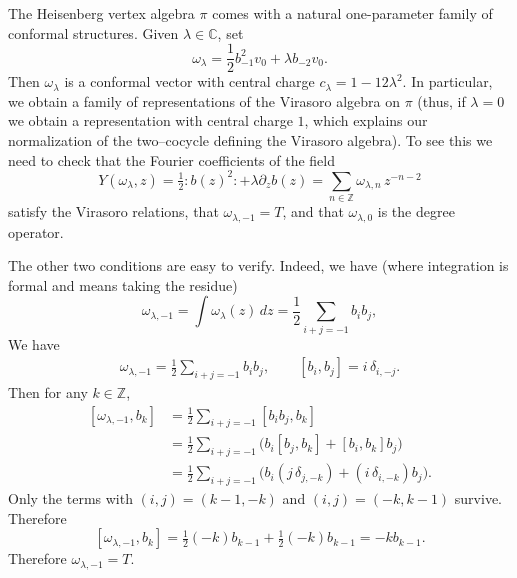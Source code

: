 \documentclass[12pt]{article}
\begin{document}
\begin{example}
The Heisenberg vertex algebra $\pi$ comes with a natural one-parameter
family of conformal structures. Given $\lambda\in\mathbb{C}$, set
\[
\omega_\lambda = \frac{1}{2}b_{-1}^2v_0 + \lambda b_{-2}v_0.
\]
Then $\omega_\lambda$ is a conformal vector with central charge
$c_\lambda = 1 - 12\lambda^2$.
In particular, we obtain a family of representations of the
Virasoro algebra on $\pi$ (thus, if $\lambda=0$ we obtain a representation
with central charge $1$, which explains our normalization of the
two--cocycle defining the Virasoro algebra).
To see this we need to check that the Fourier coefficients of the field
\[
Y(\omega_\lambda,z)
= \tfrac{1}{2} :b(z)^2: + \lambda \partial_z b(z)
= \sum_{n\in\mathbb{Z}} \omega_{\lambda,n}\, z^{-n-2}
\]
satisfy the Virasoro relations, that $\omega_{\lambda,-1}=T$, and that
$\omega_{\lambda,0}$ is the degree operator.

\medskip
\noindent
The other two conditions are easy to verify. Indeed, we have (where integration is formal and means taking the residue)
\[
\omega_{\lambda,-1}
= \int \omega_\lambda(z)\,dz
= \frac{1}{2} \sum_{i+j=-1} b_i b_j,
\]
We have
\begin{align*}
    \omega_{\lambda,-1} = \frac12\sum_{i+j=-1} b_i b_j,
\qquad [b_i,b_j] = i\,\delta_{i,-j}.
\end{align*}
Then for any $k\in\mathbb Z$,
\[\begin{aligned}
[\omega_{\lambda,-1}, b_k]
&=\frac12\sum_{i+j=-1} [b_i b_j, b_k] \\
&=\frac12\sum_{i+j=-1} \big( b_i[b_j,b_k] + [b_i,b_k]b_j \big) \\
&=\frac12\sum_{i+j=-1} \big( b_i (j\,\delta_{j,-k}) + (i\,\delta_{i,-k})b_j \big).
\end{aligned}\]
Only the terms with $(i,j)=(k-1,-k)$ and $(i,j)=(-k,k-1)$ survive.  Therefore
\[
[\omega_{\lambda,-1}, b_k] = \tfrac12(-k)b_{k-1} + \tfrac12(-k)b_{k-1} = -k b_{k-1}.
\]
Therefore $\omega_{\lambda,-1} = T$.


\end{example}
\end{document}
